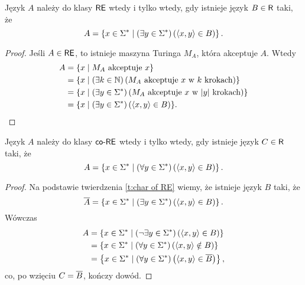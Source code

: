 \begin{theorem}\label{t:char of RE}
    Język $A$ należy do klasy $\textsf{RE}$ wtedy i tylko wtedy, gdy istnieje język $B \in \textsf{R}$ taki, że
    \[ A = \left\{x \in \Sigma^* \mid \left(\exists y \in \Sigma^* \right) \left(\left\langle x, y \right\rangle \in B\right) \right\}. \]
\end{theorem}
\begin{proof}
    Jeśli $A \in \textsf{RE}$, to istnieje maszyna Turinga $M_A$, która akceptuje $A$. Wtedy
    \begin{align*}
        A &= \{x \mid M_A \text{ akceptuje } x\} \\
        &= \{x \mid \left(\exists k \in \mathbb N\right) \left(M_A \text{ akceptuje } x \text{ w } k \text{ krokach}\right)\} \\
        &= \{x \mid \left(\exists y \in \Sigma^*\right) \left(M_A \text{ akceptuje } x \text{ w } |y| \text{ krokach}\right)\} \\
        &= \{x \mid \left(\exists y \in \Sigma^*\right) \left(\left\langle x, y \right\rangle \in B\right)\}.
    \end{align*}
\end{proof}

\begin{theorem}\label{t:char of coRE}
    Język $A$ należy do klasy $\textsf{co-RE}$ wtedy i tylko wtedy, gdy istnieje język $C \in \textsf{R}$ taki, że
    \[ A = \left\{x \in \Sigma^* \mid \left(\forall y \in \Sigma^* \right) \left(\left\langle x, y \right\rangle \in B\right) \right\}. \]
\end{theorem}
\begin{proof}
    Na podstawie twierdzenia \ref{t:char of RE} wiemy, że istnieje język $B$ taki, że
    \[ \overline{A} = \left\{x \in \Sigma^* \mid \left(\exists y \in \Sigma^* \right) \left(\left\langle x, y \right\rangle \in B\right) \right\}. \]
    Wówczas
    \begin{align*}
        A &= \left\{x \in \Sigma^* \mid \left(\neg\exists y \in \Sigma^* \right) \left(\left\langle x, y \right\rangle \in B\right) \right\} \\
        &= \left\{x \in \Sigma^* \mid \left(\forall y \in \Sigma^* \right) \left(\left\langle x, y \right\rangle \notin B\right) \right\} \\
        &= \left\{x \in \Sigma^* \mid \left(\forall y \in \Sigma^* \right) \left(\left\langle x, y \right\rangle \in \overline{B}\right) \right\},
    \end{align*}
    co, po wzięciu $C = \overline{B}$, kończy dowód.
\end{proof}


